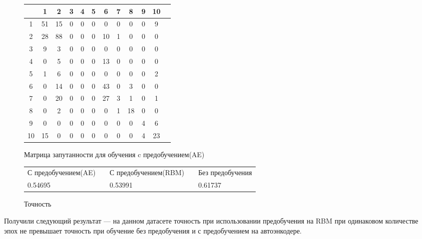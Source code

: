 {    \begin{figure}[H]

        \centering

        \begin{tabular}{|c|c|c|c|c|c|c|c|c|c|c|c|}
            \hline
            & 1  & 2  & 3 & 4 & 5 & 6  & 7  & 8  & 9  & 10 \\ \hline
            1 & 51 & 15 & 0 & 0 & 0 & 0  & 0  & 0  & 0  & 9  \\ \hline
            2 & 28 & 88 & 0 & 0 & 0 & 10 & 1  & 0  & 0  & 0  \\ \hline
            3 & 9  & 3  & 0 & 0 & 0 & 0  & 0  & 0  & 0  & 0  \\ \hline
            4 & 0  & 5  & 0 & 0 & 0 & 13 & 0  & 0  & 0  & 0  \\ \hline
            5 & 1  & 6  & 0 & 0 & 0 & 0  & 0  & 0  & 0  & 2  \\ \hline
            6 & 0  & 14 & 0 & 0 & 0 & 43 & 0  & 3  & 0  & 0  \\ \hline
            7 & 0  & 20 & 0 & 0 & 0 & 27 & 3  & 1  & 0  & 1  \\ \hline
            8 & 0  & 2  & 0 & 0 & 0 & 0  & 1  & 18 & 0  & 0  \\ \hline
            9 & 0  & 0  & 0 & 0 & 0 & 0  & 0  & 0  & 4  & 6  \\ \hline
        10 & 15 & 0  & 0 & 0 & 0 & 0  & 0  & 0  & 4  & 23 \\ \hline
        \end{tabular}
        \caption{Матрица запутанности для обучения c предобучением(AE)}
    \end{figure}



    \begin{figure}[H]
        \centering
        \begin{tabular}{|l|l|l|l|l|}
        \cline{1-1} \cline{3-3} \cline{5-5}
        С предобучением(AE) & & С предобучением(RBM)  &  & Без предобучения \\ \cline{1-1} \cline{3-3} \cline{5-5} 
        0.54695             & & 0.53991               &  & 0.61737          \\ \cline{1-1} \cline{3-3} \cline{5-5}
        \end{tabular}

        \caption{Точность}

    \end{figure}

    Получили следующий результат --- на данном датасете точность при использовании предобучения на RBM  при одинаковом количестве эпох не превышает точность при обучение без предобучения и с предобучением на автоэнкодере.

}
\newcommand{\conclusion}{
    научились осуществлять предобучение нейронных сетей с помощью RBM.    
}




